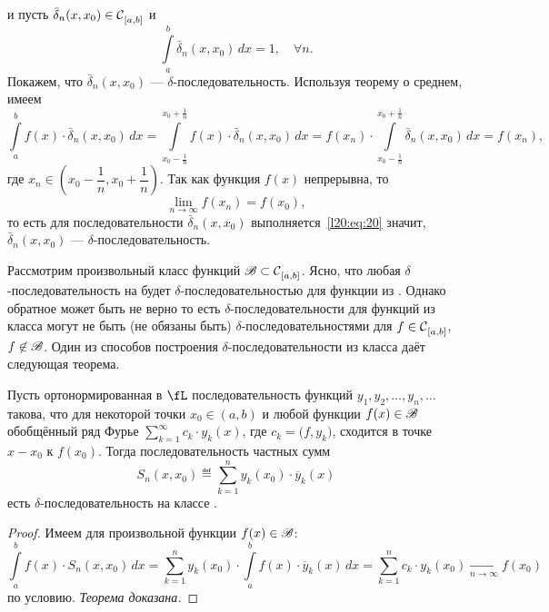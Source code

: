 и пусть $\bar{\delta}_n(x,x_0)\in\Cfn[{[a,b]}]{}$ и 
\begin{equation*}
	\int\limits_a^b \bar\delta_n(x,x_0)\,dx=1,\quad\forall n.
\end{equation*}
Покажем, что $\bar\delta_n(x,x_0)$ --- $\delta$-последовательность. Используя теорему о среднем, имеем
\begin{equation*}
	\int\limits_a^b f(x)\cdot\bar\delta_n(x,x_0)\,dx=\int\limits_{x_0-\frac{1}{n}}^{x_0+\frac{1}{n}} f(x)\cdot\bar\delta_n(x,x_0)\,dx=f(x_n)\cdot\int\limits_{x_0-\frac{1}{n}}^{x_0+\frac{1}{n}}\bar\delta_n(x,x_0)\,dx=f(x_n),
\end{equation*}
где $x_n\in\left(x_0-\dfrac{1}{n},x_0+\dfrac{1}{n}\right)$. Так как функция $f(x)$ непрерывна, то 
\begin{equation*}
	\lim\limits_{n\to\infty}f(x_n)=f(x_0),
\end{equation*}
то есть для последовательности $\bar\delta_n(x,x_0)$ выполняется~\eqref{l20:eq:20} значит, $\bar\delta_n(x,x_0)$ --- $\delta$-последовательность.

Рассмотрим произвольный класс функций $\ms{B}\subset\Cfn[{[a,b]}]{}$. Ясно, что любая $\delta$-последовательность на \Cfn[{[a,b]}]{} будет $\delta$-последовательностью для функции из . Однако обратное может быть не верно то есть $\delta$-последовательности для функций из класса  могут не быть (не обязаны быть) $\delta$-последовательностями для $f\in\Cfn[{[a,b]}]{}$, $f\not\in\ms{B}$. Один из способов построения $\delta$-последовательности из класса  даёт следующая теорема.
\begin{_teor}\label{l20:teor:1}
	Пусть ортонормированная в $\fL$ последовательность функций $y_1,y_2,\ldots,y_n,\ldots$ такова, что для некоторой точки $x_0\in(a,b)$ и любой функции $f(x)\in\ms{B}$ обобщённый ряд Фурье $\displaystyle\sum\limits_{k=1}^{\infty}c_k\cdot y_k(x)$, где $c_k=\big(f,y_k\big)$, сходится в точке $x-x_0$ к $f(x_0)$. Тогда последовательность частных сумм
	\begin{equation}\label{l20:eq:21}
		S_n(x,x_0)\eqdef\sum\limits_{k=1}^{n}y_k(x_0)\cdot\overline{y}_k(x)
	\end{equation}
	есть $\delta$-последовательность на классе .
\end{_teor}
\begin{proof}
	Имеем для произвольной функции $f(x)\in\ms{B}$:
	\begin{equation*}
		\int\limits_a^b f(x)\cdot S_n(x,x_0)\,dx=\sum\limits_{k=1}^{n}y_k(x_0)\cdot\int\limits_a^b f(x)\cdot\overline{y}_k(x)\,dx=\sum\limits_{k=1}^{n} c_k\cdot y_k(x_0)\mathop{\longrightarrow}\limits_{n\to\infty}f(x_0)
	\end{equation*}
	по условию. \emph{Теорема доказана.}
\end{proof}

